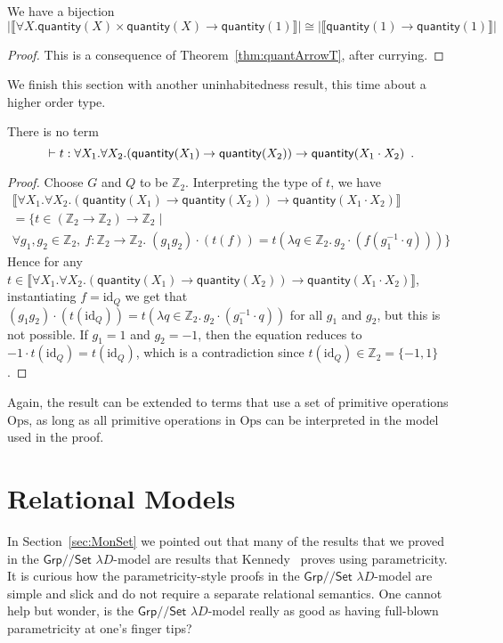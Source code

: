 \documentclass[a4paper,UKenglish]{lipics}
\theoremstyle{plain}
\newcommand{\msf}[1]{\mathsf{#1}} %
\newcommand{\Grp}{\msf{Grp}}
\newcommand{\Set}{\msf{Set}}
\newcommand{\Lslice}[1]{#1/\!/\Set}
\newcommand{\GrpSet}{\Lslice{\Grp}}
\newcommand{\bbZ}{\mathbb{Z}}
\newcommand{\sem}[1]{\ensuremath{\llbracket #1 \rrbracket}}
\newcommand{\qnt}{\msf{quantity}}
\newcommand{\id}{\mathrm{id}}
\begin{document}
\begin{theorem}We have a bijection
 \label{thm:AppSubs}
 \[
 |\sem{\forall X . \qnt(X) \times \qnt(X) \rightarrow \qnt(1)}| \cong |\sem{\qnt(1)\rightarrow \qnt(1)}|
 \]
\end{theorem}
\begin{proof}
This is a consequence of Theorem~\ref{thm:quantArrowT}, after currying.
\end{proof}

We finish this section with another uninhabitedness result, this time
about a higher order type.

\begin{theorem}\label{thm:UninhabInt}
There is no term
\[
\vdash t : \forall X_1. \forall X_2. (\qnt(X_1) \rightarrow \qnt(X_2)) \rightarrow \qnt(X_1 \cdot X_2)\enspace \text.
\]
\end{theorem}
\begin{proof}
Choose $G$ and $Q$ to be $\bbZ_2$. Interpreting the type of $t$, we have
 \begin{multline*}
\sem{\forall X_1. \forall X_2. (\qnt(X_1) \rightarrow \qnt(X_2)) \rightarrow \qnt(X_1 \cdot X_2)} \\=
\{ t \in (\bbZ_2 {\rightarrow} \bbZ_2) {\rightarrow} \bbZ_2 \; | \\ \forall g_1,  g_2 \in \bbZ_2,\ f:\bbZ_2{\to} \bbZ_2. \; (g_1 g_2) \cdot (t(f))=
t(\lambda q\in \bbZ_2.\,g_2\cdot (f(g_1^{-1}\cdot q))) \}
 \end{multline*}
Hence for any $t \in  \sem{\forall X_1. \forall X_2. (\qnt(X_1) \rightarrow \qnt(X_2)) \rightarrow \qnt(X_1 \cdot X_2)}$, instantiating $f=\id_Q$ we get that $(g_1 g_2) \cdot (t(\id_Q)) = t(\lambda q\in \bbZ_2.\,g_2\cdot (g_1^{-1}\cdot q))$ for all $g_1$ and $g_2$, but this is not possible. If $g_1 = 1$ and $g_2 = -1$, then the equation reduces to $-1\cdot t(\id_Q)=t(\id_Q)$, which is a contradiction since $t(\id_Q) \in \bbZ_2 = \{-1, 1\}$.
\end{proof}
Again, the result can be extended to terms that use a set of primitive
operations $\mathrm{Ops}$, as long as all primitive operations in
$\mathrm{Ops}$ can be interpreted in the model used in the proof.

\section{Relational Models}
\label{sec:param}
In Section~\ref{sec:MonSet} we pointed out that many of the results that we proved in the $\GrpSet$ $\lambda D$-model are results that  Kennedy~\cite{Kennedy:1997:RPU:263699.263761} proves using parametricity. It is curious how the parametricity-style proofs in the $\GrpSet$ $\lambda D$-model are simple and slick and do not require a separate relational semantics. One cannot help but wonder, is the $\GrpSet$ $\lambda D$-model really as good as having full-blown parametricity at one's finger tips?
\end{document}
